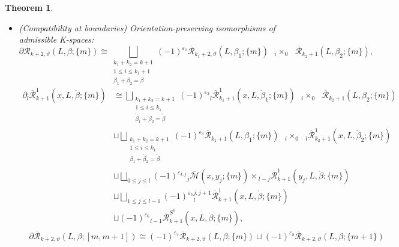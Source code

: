 \documentclass[a4paper]{article}
\newtheorem{theorem}{Theorem}
\numberwithin{equation}{section}
\begin{document}
\begin{theorem}
\begin{itemize}
    \item[(iv)] (Compatibility at boundaries) Orientation-preserving isomorphisms of admissible K-spaces:
    \begin{equation}\label{eq:bd1}
    \partial\overline{\mathcal{R}}_{k+2,\vartheta}(L,\beta;\{m\})\cong\bigsqcup_{\substack{k_1+k_2=k+1\\1\leq i\leq k_1+1\\ \beta_1+\beta_2=\beta}}(-1)^{\varepsilon_1}\overline{\mathcal{R}}_{k_1+2,\vartheta}(L,\beta_1;\{m\})\textrm{ }{{}_i\times_0}\textrm{ }\overline{\mathcal{R}}_{k_2+1}(L,\beta_2;\{m\}),
    \end{equation}
    \begin{equation}\label{eq:bd2}
    \begin{split}
    \partial{}_l\overline{\mathcal{R}}_{k+1}^1(x,L,\ring{\beta};\{m\})&\cong\bigsqcup_{\substack{k_1+k_2=k+1\\1\leq i\leq k_1\\ \ring{\beta}_1+\beta_2=\ring{\beta}}}(-1)^{\varepsilon_2}{}_l\overline{\mathcal{R}}_{k_1+1}^1(x,L,\ring{\beta}_1;\{m\})\textrm{ }{{}_i\times_0}\textrm{ }\overline{\mathcal{R}}_{k_2+1}(L,\beta_2;\{m\}) \\
    &\sqcup\bigsqcup_{\substack{k_1+k_2=k+1\\1\leq i\leq k_1\\ \beta_1+\ring{\beta}_2=\ring{\beta}}}(-1)^{\varepsilon_3}\overline{\mathcal{R}}_{k_1+1}(L,\beta_1;\{m\})\textrm{ }{{}_i\times_0}\textrm{ }{}_l\overline{\mathcal{R}}^1_{k_2+1}(x,L,\ring{\beta}_2;\{m\}) \\
    &\sqcup\bigsqcup_{0\leq j\leq l}(-1)^{\varepsilon_{4,j}}{}_j\overline{\mathcal{M}}(x,y_j;\{m\})\times{}_{l-j}\overline{\mathcal{R}}_{k+1}^1(y_j,L,\ring{\beta};\{m\}) \\
    &\sqcup\bigsqcup_{1\leq j\leq l-1}(-1)^{\varepsilon_5}{}_l^{j,j+1}\overline{\mathcal{R}}_{k+1}^1(x,L,\ring{\beta};\{m\}) \\
    &\sqcup(-1)^{\varepsilon_6}{}_{l-1}\overline{\mathcal{R}}_{k+1}^{S^1}(x,L,\ring{\beta};\{m\}),
    \end{split}
    \end{equation}
    \begin{equation}\label{eq:bd4}
    \begin{split}
    &\partial\overline{\mathcal{R}}_{k+2,\vartheta}(L,\beta;[m,m+1])\cong(-1)^{\varepsilon_7}\overline{\mathcal{R}}_{k+2,\vartheta}(L,\beta;\{m\})\sqcup(-1)^{\varepsilon_{8}}\overline{\mathcal{R}}_{k+2,\vartheta}(L,\beta;\{m+1\}) \\

\end{split}
\end{equation}
\end{itemize}
\end{theorem}
\end{document}
